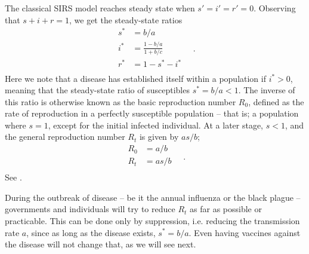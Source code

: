 \documentclass[]{article}
\begin{document}
The classical SIRS model reaches steady state when $s'=i'=r'=0$. Observing that $s + i + r = 1$, we get the steady-state ratios
\begin{equation} \label{eq:sirs-classic-steady}
\begin{aligned}
	s^* &= b/a \\
	i^* &= \frac{1 - b/a}{1 + b/c} \\
	r^* &= 1 - s^* - i^* \\
\end{aligned} \quad .
\end{equation}
Here we note that a disease has established itself within a population if $i^* > 0$, meaning that the steady-state ratio of susceptibles $s^* = b/a < 1$. The inverse of this ratio is otherwise known as the basic reproduction number $R_0$, defined as the rate of reproduction in a perfectly susceptible population -- that is; a population where $s = 1$, except for the initial infected individual. At a later stage, $s < 1$, and the general reproduction number $R_t$ is given by $as/b$;
\begin{equation} \label{eq:reproduction-numbers}
\begin{aligned}
	R_0 &= a/b \\
	R_t &= as/b \\
\end{aligned} \quad .
\end{equation}
See \cite{milligan2015}.

During the outbreak of disease -- be it the annual influenza or the black plague -- governments and individuals will try to reduce $R_t$ as far as possible or practicable. This can be done only by suppression, i.e. reducing the transmission rate $a$, since as long as the disease exists, $s^* = b/a$. Even having vaccines against the disease will not change that, as we will see next. 
\end{document}
